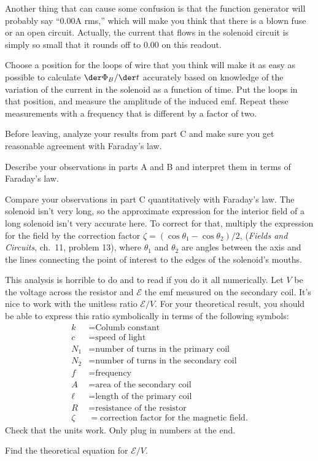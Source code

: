 Another thing that can cause some confusion is that the function generator
will probably say ``0.00A rms,'' which will make you think that there is
a blown fuse or an open circuit. Actually, the current that flows in the
solenoid circuit is simply so small that it rounds off to 0.00 on this
readout.

Choose a position for the loops of wire that
you think will make it as easy as possible to calculate $\der \Phi_B/\der t$
accurately based on knowledge of the variation of the
current in the solenoid as a function of time. Put the loops
in that position, and measure the amplitude of the induced
emf. Repeat these measurements with a frequency that
is different by a factor of two.

\selfcheck

Before leaving, analyze your results from part C and make
sure you get reasonable agreement with Faraday's law.

\analysis

Describe your observations in parts A and B and interpret
them in terms of Faraday's law.

Compare your observations in part C quantitatively with Faraday's law.
The solenoid isn't very long, so the approximate expression for the
interior field of a long solenoid isn't very accurate here. To correct
for that, multiply the expression for the field by the correction
factor $\zeta = (\cos\theta_1-\cos\theta_2)/2$,
(\emph{Fields and Circuits}, ch.~11, problem 13), where
$\theta_1$ and $\theta_2$ are angles between the axis and the lines connecting
the point of interest to the edges of the solenoid's mouths.

This analysis is horrible to do and to read if you do it all numerically.
Let $V$ be the voltage across the resistor and $\mathcal{E}$ the emf measured
on the secondary coil. It's nice to work with the unitless ratio $\mathcal{E}/V$.
For your theoretical result, you should be
able to express this ratio symbolically in terms of the following
symbols:
\begin{align*}
 k  &= \text{Columb constant} \\
 c  &= \text{speed of light} \\
 N_1  &= \text{number of turns in the primary coil} \\
 N_2  &= \text{number of turns in the secondary coil} \\
 f  &= \text{frequency} \\
 A  &= \text{area of the secondary coil} \\
 \ell  &= \text{length of the primary coil} \\
 R  &= \text{resistance of the resistor} \\
 \zeta  &= \text{correction factor for the magnetic field}.
\end{align*}
Check that the units work. Only plug in numbers at the end.

\prelab

\prelabquestion Find the theoretical equation for $\mathcal{E}/V$.
